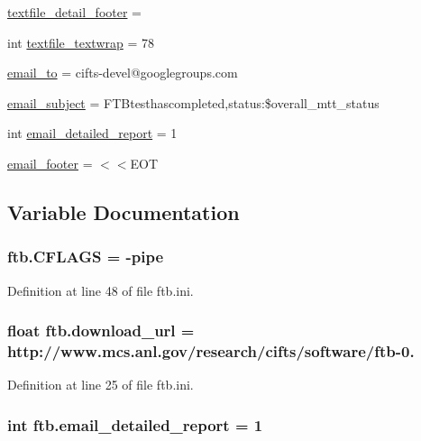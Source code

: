 \begin{DoxyCompactItemize}
\hyperlink{namespaceftb_a16b758d8bc177b624ed4801c0dea55c8}{textfile\-\_\-detail\-\_\-footer} =
\item 
int \hyperlink{namespaceftb_a5be38c1bd9675f6ab63cbe757193526d}{textfile\-\_\-textwrap} = 78
\item 
\hyperlink{namespaceftb_af77d6a2460d34d47c8aa42d7d72c0100}{email\-\_\-to} = cifts-\/devel@googlegroups.\-com
\item 
\hyperlink{namespaceftb_a32d4c73434de192cc67e8c20def937a8}{email\-\_\-subject} = F\-T\-Btesthascompleted,status\-:\$overall\-\_\-mtt\-\_\-status
\item 
int \hyperlink{namespaceftb_a0a227d10a4a01aa6ddc866a696d7b0b1}{email\-\_\-detailed\-\_\-report} = 1
\item 
\hyperlink{namespaceftb_a1945f3f78c2c8a76e10e5c6b6ab49edc}{email\-\_\-footer} = $<$$<$E\-O\-T
\end{DoxyCompactItemize}


\subsection{Variable Documentation}
\hypertarget{namespaceftb_ac8a70036199459a6c1c0582d012b447c}{
\subsubsection[{C\-F\-L\-A\-G\-S}]{\setlength{\rightskip}{0pt plus 5cm}ftb.\-C\-F\-L\-A\-G\-S = -\/pipe}}\label{namespaceftb_ac8a70036199459a6c1c0582d012b447c}


Definition at line 48 of file ftb.\-ini.

\hypertarget{namespaceftb_ae96f515f42a6de5c342c0349668b1935}{
\subsubsection[{download\-\_\-url}]{\setlength{\rightskip}{0pt plus 5cm}float ftb.\-download\-\_\-url = http\-://www.\-mcs.\-anl.\-gov/research/cifts/software/ftb-\/0.}}\label{namespaceftb_ae96f515f42a6de5c342c0349668b1935}


Definition at line 25 of file ftb.\-ini.

\hypertarget{namespaceftb_a0a227d10a4a01aa6ddc866a696d7b0b1}{
\subsubsection[{email\-\_\-detailed\-\_\-report}]{\setlength{\rightskip}{0pt plus 5cm}int ftb.\-email\-\_\-detailed\-\_\-report = 1}}\label{namespaceftb_a0a227d10a4a01aa6ddc866a696d7b0b1}


